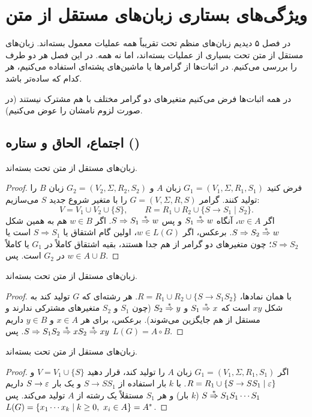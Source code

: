 \chapter{ویژگی‌های بستاری زبان‌های مستقل از متن}

در فصل ۵ دیدیم زبان‌های منظم تحت تقریباً همه عملیات معمول بسته‌اند. زبان‌های مستقل از متن تحت بسیاری از عملیات بسته‌اند، اما نه همه. در این فصل هر دو طرف را بررسی می‌کنیم. در اثبات‌ها از گرامرها یا ماشین‌های پشته‌ای استفاده می‌کنیم، هر کدام که ساده‌تر باشد.

در همه اثبات‌ها فرض می‌کنیم متغیرهای دو گرامر مختلف با هم مشترک نیستند (در صورت لزوم نامشان را عوض می‌کنیم).

\section{اجتماع، الحاق و ستاره ()}

\begin{theorem}
زبان‌های مستقل از متن تحت  بسته‌اند.
\end{theorem}
\begin{proof}
فرض کنید $G_1=(V_1,\Sigma,R_1,S_1)$ زبان $A$ و $G_2=(V_2,\Sigma,R_2,S_2)$ زبان $B$ را تولید کنند. گرامر $G=(V,\Sigma,R,S)$ را با متغیر شروع جدید $S$ می‌سازیم:
\[V=V_1\cup V_2\cup\{S\},\qquad R=R_1\cup R_2\cup\{S\to S_1\mid S_2\}.\]
اگر $w\in A$، آنگاه $S_1\overset{*}{\Rightarrow} w$ و پس $S\Rightarrow S_1\overset{*}{\Rightarrow} w$. اگر $w\in B$ هم به همین شکل $S\Rightarrow S_2\overset{*}{\Rightarrow} w$. برعکس، اگر $w\in L(G)$، اولین گام اشتقاق یا $S\Rightarrow S_1$ است یا $S\Rightarrow S_2$؛ چون متغیرهای دو گرامر از هم جدا هستند، بقیه اشتقاق کاملاً در $G_1$ یا کاملاً در $G_2$ است. پس $w\in A\cup B$.
\end{proof}

\begin{theorem}
زبان‌های مستقل از متن تحت  بسته‌اند.
\end{theorem}
\begin{proof}
با همان نمادها، $R=R_1\cup R_2\cup\{S\to S_1S_2\}$. هر رشته‌ای که $G$ تولید کند به شکل $xy$ است که $S_1\overset{*}{\Rightarrow} x$ و $S_2\overset{*}{\Rightarrow} y$ (چون $S_1$ و $S_2$ متغیرهای مشترکی ندارند و مستقل از هم جایگزین می‌شوند). برعکس، برای هر $x\in A$ و $y\in B$ داریم $S\Rightarrow S_1S_2\overset{*}{\Rightarrow} xS_2\overset{*}{\Rightarrow} xy$. پس $L(G)=A\circ B$.
\end{proof}

\begin{theorem}
زبان‌های مستقل از متن تحت  بسته‌اند.
\end{theorem}
\begin{proof}
اگر $G_1=(V_1,\Sigma,R_1,S_1)$ زبان $A$ را تولید کند، قرار دهید $V=V_1\cup\{S\}$ و $R=R_1\cup\{S\to SS_1\mid\varepsilon\}$. با $k$ بار استفاده از $S\to SS_1$ و یک بار $S\to\varepsilon$ داریم $S\overset{*}{\Rightarrow} S_1S_1\cdots S_1$ ($k$ بار) و هر $S_1$ مستقلاً یک رشته از $A$ تولید می‌کند. پس $L(G)=\{x_1\cdots x_k\mid k\ge0,\ x_i\in A\}=A^*$.
\end{proof}

